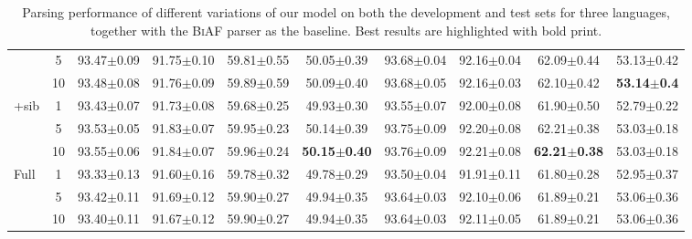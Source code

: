 \documentclass[11pt,a4paper]{article}
\begin{document}
\begin{table*}[h]
{\begin{tabular}[t]{l|c|cccc|cccc}
& 5 & 93.47$\pm$0.09 & 91.75$\pm$0.10 & 59.81$\pm$0.55 & 50.05$\pm$0.39 & 93.68$\pm$0.04 & 92.16$\pm$0.04 & 62.09$\pm$0.44 & 53.13$\pm$0.42 \\
& 10 & 93.48$\pm$0.08 & 91.76$\pm$0.09 & 59.89$\pm$0.59 & 50.09$\pm$0.40 & 93.68$\pm$0.05 & 92.16$\pm$0.03 & 62.10$\pm$0.42 & \textbf{53.14$\pm$0.4} \\
\hline
\multirow{3}{*}{\textsf{+sib}} & 1 & 93.43$\pm$0.07 & 91.73$\pm$0.08 & 59.68$\pm$0.25 & 49.93$\pm$0.30 & 93.55$\pm$0.07 & 92.00$\pm$0.08 & 61.90$\pm$0.50 & 52.79$\pm$0.22 \\
& 5 & 93.53$\pm$0.05 & 91.83$\pm$0.07 & 59.95$\pm$0.23 & 50.14$\pm$0.39 & 93.75$\pm$0.09 & 92.20$\pm$0.08 & 62.21$\pm$0.38 & 53.03$\pm$0.18 \\
& 10 & 93.55$\pm$0.06 & 91.84$\pm$0.07 & 59.96$\pm$0.24 & \textbf{50.15$\pm$0.40} & 93.76$\pm$0.09 & 92.21$\pm$0.08 & \textbf{62.21$\pm$0.38} & 53.03$\pm$0.18 \\
\hline
\multirow{3}{*}{\textsf{Full}} & 1 & 93.33$\pm$0.13 & 91.60$\pm$0.16 & 59.78$\pm$0.32 & 49.78$\pm$0.29 & 93.50$\pm$0.04 & 91.91$\pm$0.11 & 61.80$\pm$0.28 & 52.95$\pm$0.37 \\
& 5 & 93.42$\pm$0.11 & 91.69$\pm$0.12 & 59.90$\pm$0.27 & 49.94$\pm$0.35 & 93.64$\pm$0.03 & 92.10$\pm$0.06 & 61.89$\pm$0.21 & 53.06$\pm$0.36 \\
& 10 & 93.40$\pm$0.11 & 91.67$\pm$0.12 & 59.90$\pm$0.27 & 49.94$\pm$0.35 & 93.64$\pm$0.03 & 92.11$\pm$0.05 & 61.89$\pm$0.21 & 53.06$\pm$0.36 \\
\hline
\end{tabular}
}
\caption{Parsing performance of different variations of our model on both the development and test sets for three languages, together with the \textsc{BiAF} parser as the baseline. Best results are highlighted with bold print.}
\label{tab:main:results}
\end{table*}
\end{document}
